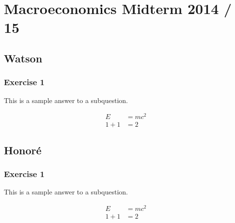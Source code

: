 \section*{Macroeconomics Midterm 2014 / 15}

{
\subsection*{Watson}

\subsubsection*{Exercise 1}

\begin{enumerate}[label=(\alph*)]
{\item 
This is a sample answer to a subquestion.

\begin{align*}
    E &= mc^2 \\
    1 + 1 &= 2
\end{align*}
}
\end{enumerate}
}

\newpage
{
\subsection*{Honor\'e}

\subsubsection*{Exercise 1}

\begin{enumerate}[label=(\alph*)]
{\item 
This is a sample answer to a subquestion.

\begin{align*}
    E &= mc^2 \\
    1 + 1 &= 2
\end{align*}
}
\end{enumerate}
}
